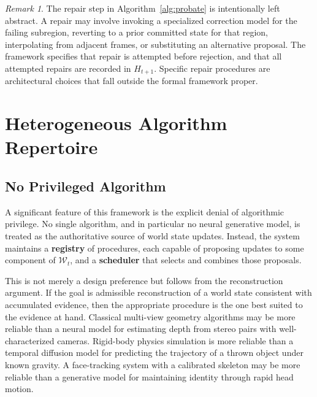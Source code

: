 \documentclass[12pt,a4paper]{article}
\theoremstyle{plain}
\theoremstyle{definition}
\theoremstyle{remark}
\newtheorem{remark}[theorem]{Remark}
\begin{document}
\begin{remark}
The repair step in Algorithm~\ref{alg:probate} is intentionally left abstract. A repair may involve invoking a specialized correction model for the failing subregion, reverting to a prior committed state for that region, interpolating from adjacent frames, or substituting an alternative proposal. The framework specifies that repair is attempted before rejection, and that all attempted repairs are recorded in $H_{t+1}$. Specific repair procedures are architectural choices that fall outside the formal framework proper.
\end{remark}

\section{Heterogeneous Algorithm Repertoire}
\label{sec:repertoire}

\subsection{No Privileged Algorithm}

A significant feature of this framework is the explicit denial of algorithmic privilege. No single algorithm, and in particular no neural generative model, is treated as the authoritative source of world state updates. Instead, the system maintains a \textbf{registry} of procedures, each capable of proposing updates to some component of $\mathcal{W}_t$, and a \textbf{scheduler} that selects and combines those proposals.

This is not merely a design preference but follows from the reconstruction argument. If the goal is admissible reconstruction of a world state consistent with accumulated evidence, then the appropriate procedure is the one best suited to the evidence at hand. Classical multi-view geometry algorithms \cite{hartley2003multiple} may be more reliable than a neural model for estimating depth from stereo pairs with well-characterized cameras. Rigid-body physics simulation is more reliable than a temporal diffusion model for predicting the trajectory of a thrown object under known gravity. A face-tracking system with a calibrated skeleton may be more reliable than a generative model for maintaining identity through rapid head motion.
\end{document}
